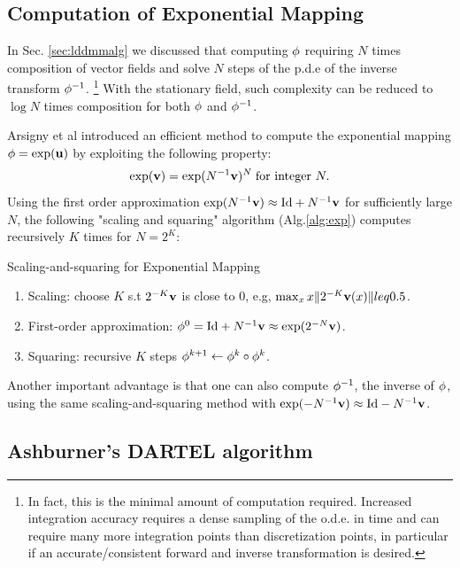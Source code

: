 \documentclass[letterpaper,12pt]{article}
\begin{document}
\subsection{Computation of Exponential Mapping}

In Sec. \ref{sec:lddmmalg} we discussed that computing $\phi$
requiring $N$ times composition of vector fields and solve $N$ steps of 
the p.d.e of the inverse transform $\phi^{-1}$. \footnote{In fact,
  this is the minimal amount of computation required.  Increased
  integration accuracy requires a dense sampling of the o.d.e. in time
  and can require many more integration points than discretization
  points, in particular if an accurate/consistent forward and inverse
  transformation is desired.}  With the stationary field, such complexity can be reduced to $\log N$ times composition for both $\phi$ and $\phi^{-1}$. 

Arsigny et al \cite{Arsigny2006} introduced an efficient method to compute the exponential mapping $\phi = \exp(\mathbf{u})$ by exploiting the following property:
\begin{align}
\exp(\mathbf{v}) = \exp(N^{-1} \mathbf{v} )^N \;\text{for integer } N.
\end{align}
Using the first order approximation $\exp(N^{-1} \mathbf{v}) \approx \text{Id} + N^{-1}\mathbf{v}$ for sufficiently large $N$, the following "scaling and squaring" algorithm (Alg.\ref{alg:exp}) computes recursively $K$ times for $N = 2^K$:
\begin{algorithm}
\caption{Scaling-and-squaring for Exponential Mapping}
\label{alg:exp}
\begin{enumerate}
\item{Scaling: choose $K$ s.t $2^{-K}\mathbf{v}$ is close to 0, e.g, $\max_x x\|2^{-K}\mathbf{v}(x)\| leq 0.5 $. 
}
\item{First-order approximation: $\phi^{0} =  \text{Id} + N^{-1}\mathbf{v} \approx \exp(2^{-N} \mathbf{v}) $.
}
\item{Squaring: recursive $K$ steps $\phi^{k+1} \leftarrow \phi^{k} \circ \phi^{k}$. 
}
\end{enumerate}
\end{algorithm}

Another important advantage is that one can also compute $\phi^{-1}$, the inverse of $\phi$, using the same scaling-and-squaring method with $\exp(-N^{-1} \mathbf{v}) \approx \text{Id} - N^{-1}\mathbf{v}$. 


\subsection{Ashburner's DARTEL algorithm}
\end{document}
